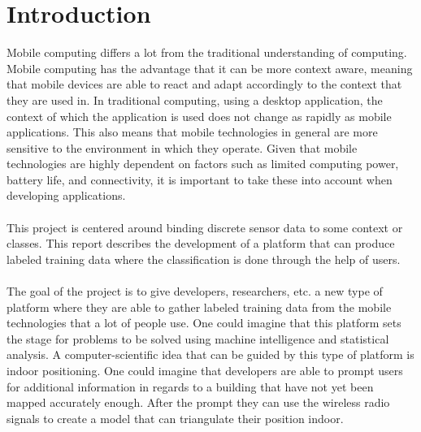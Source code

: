 \chapter{Introduction}
\label{cha:introduction}
Mobile computing  differs a lot from the traditional understanding of computing. Mobile computing has the advantage that it can be more context aware, meaning that mobile devices are able to react and adapt accordingly to the context that they are used in. In traditional computing, using a desktop application, the context of which the application is used does not change as rapidly as mobile applications. This also means that mobile technologies in general are more sensitive to the environment in which they operate. Given that mobile technologies are highly dependent on factors such as limited computing power, battery life, and connectivity, it is important to take these into account when developing applications.
\\\\
This project is centered around binding discrete sensor data to some context or classes. This report describes the development of a platform that can produce labeled training data where the classification is done through the help of users. 
\\\\
The goal of the project is to give developers, researchers, etc. a new type of platform where they are able to gather labeled training data from the mobile technologies that a lot of people use. One could imagine that this platform sets the stage for problems to be solved using machine intelligence and statistical analysis. A computer-scientific idea that can be guided by this type of platform is indoor positioning. One could imagine that developers are able to prompt users for additional information in regards to a building that have not yet been mapped accurately enough. After the prompt they can use the wireless radio signals to create a model that can triangulate their position indoor. 


